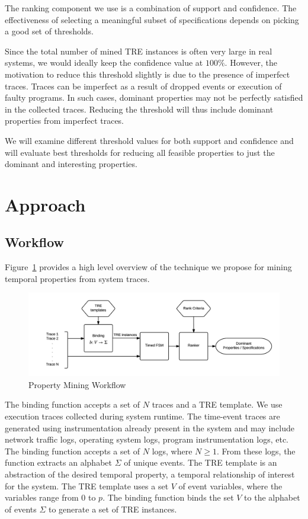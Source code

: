 \documentclass[]{sigplanconf}
\begin{document}
The ranking component we use is a combination of support and confidence. The effectiveness of selecting a meaningful subset of specifications depends on picking a good set of thresholds.

Since the total number of mined TRE instances is often very large in real systems, we would ideally keep the confidence value at $100 \%$. However, the motivation to reduce this threshold slightly is due to the presence of imperfect traces. Traces can be imperfect as a result of dropped events or execution of faulty programs. In such cases, dominant properties may not be perfectly satisfied in the collected traces. Reducing the threshold will thus include dominant properties from imperfect traces.

We will examine different threshold values for both support and confidence and will evaluate best thresholds for reducing all feasible properties to just the dominant and interesting properties.

\section{Approach} \label{Approach}

\subsection{Workflow}

Figure~\ref{fig:approach} provides a high level overview of the technique we propose for mining temporal properties from system traces.

\begin{figure}[h]
  \centering
  \includegraphics[trim = 1cm 0cm 0cm 0cm,clip = true,width=\linewidth]{figures/Workflow.png}
  \caption{Property Mining Workflow}
  \label{fig:approach}
\end{figure}

The binding function accepts a set of $N$ traces and a TRE template. We use execution traces collected during system runtime. The time-event traces are generated using instrumentation already present in the system and may include network traffic logs, operating system logs, program instrumentation logs, etc. The binding function accepts a set of $N$ logs, where $N \ge 1$. From these logs, the function extracts an alphabet $\Sigma$ of unique events. The TRE template is an abstraction of the desired temporal property, a temporal relationship of interest for the system. The TRE template uses a set $V$ of event variables, where the variables range from $0$ to $p$. The binding function binds the set $V$ to the alphabet of events $\Sigma$ to generate a set of TRE instances.
\end{document}
